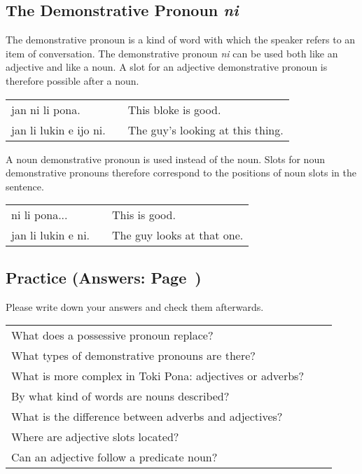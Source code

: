 %
\subsection*{The Demonstrative Pronoun \textit{ni}}
%

The demonstrative pronoun is a kind of word with which the speaker refers to an  item of conversation. 
The demonstrative pronoun \textit{ni} can be used both like an adjective and like a noun.  
A slot for an adjective demonstrative pronoun is therefore possible after a noun. 

\begin{supertabular}{p{5,5cm}|ll}
jan ni li pona. && This bloke is good. \\
jan li lukin e ijo ni. && The guy's looking at this thing. \\
\end{supertabular}

A noun demonstrative pronoun is used instead of the noun. 
Slots for noun demonstrative pronouns therefore correspond to the positions of noun slots in the sentence. 

\begin{supertabular}{p{5,5cm}|ll}
ni li pona... && This is good. \\
jan li lukin e ni. && The guy looks at that one. \\
\end{supertabular}

\newpage
\subsection*{Practice (Answers: Page~\pageref{'adjectives'})}

Please write down your answers and check them afterwards. 

\begin{supertabular}{p{5,5cm}|ll}
What does a possessive pronoun replace? &&  \\ %
What types of demonstrative pronouns are there? &&  \\ %
What is more complex in Toki Pona: adjectives or adverbs? &&  \\ %
By what kind of words are nouns described? &&   \\ %
What is the difference between adverbs and adjectives? &&  \\ %
Where are adjective slots located? &&  \\ %
Can an adjective follow a predicate noun? &&  \\ %
\end{supertabular}

